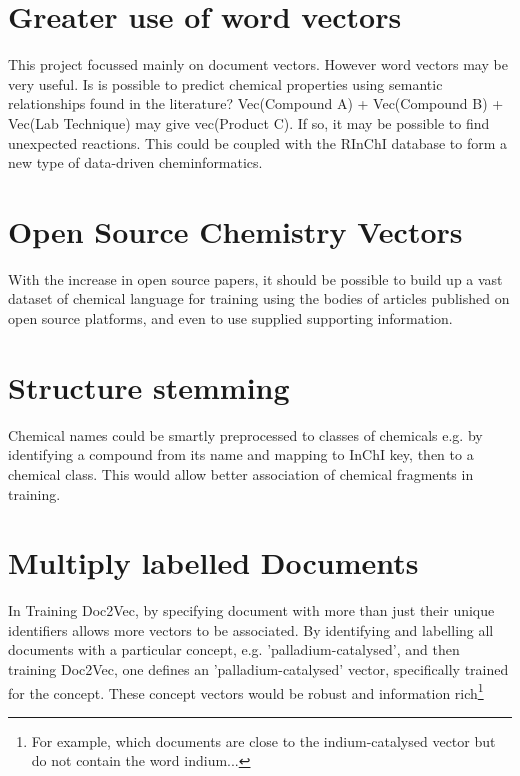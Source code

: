 \section{Greater use of word vectors}
This project focussed mainly on document vectors. However word vectors may be very useful. Is is possible to predict chemical properties using semantic relationships found in the literature? Vec(Compound A) + Vec(Compound B) + Vec(Lab Technique) may give vec(Product C). If so, it may be possible to find unexpected reactions. This could be coupled with the RInChI database to form a new type of data-driven cheminformatics.
\section{Open Source Chemistry Vectors}
With the increase in open source papers, it should be possible to build up a vast dataset of chemical language for training using the bodies of articles published on open source platforms, and even to use supplied supporting information. 
\section{Structure stemming}
Chemical names could be smartly preprocessed to classes of chemicals e.g. by identifying a compound from its name and mapping to InChI key, then to a chemical class. This would allow better association of chemical fragments in training.
\section{Multiply labelled Documents}
In Training Doc2Vec, by specifying document with more than just their unique identifiers allows more vectors to be associated. By identifying and labelling all documents with a particular concept, e.g. 'palladium-catalysed', and then training Doc2Vec, one defines an 'palladium-catalysed' vector, specifically trained for the concept. These concept vectors would be robust and information rich\footnote{For example, which documents are close to the indium-catalysed vector but do not contain the word indium...}
